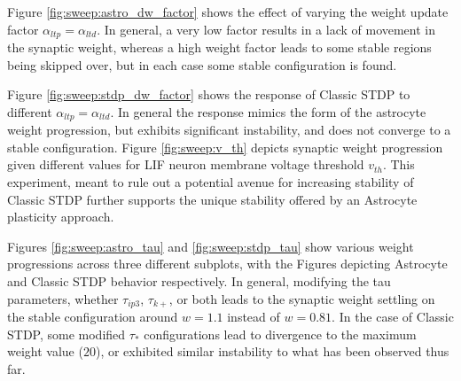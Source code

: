 Figure \ref{fig:sweep:astro_dw_factor} shows the effect of varying the weight
update factor $\alpha_{ltp}=\alpha_{ltd}$. In general, a very low factor results
in a lack of movement in the synaptic weight, whereas a high weight factor leads
to some stable regions being skipped over, but in each case some stable
configuration is found.



Figure \ref{fig:sweep:stdp_dw_factor} shows the response of Classic STDP to
different $\alpha_{ltp}=\alpha_{ltd}$. In general the response mimics the form
of the astrocyte weight progression, but exhibits significant instability, and
does not converge to a stable configuration. Figure \ref{fig:sweep:v_th} depicts
synaptic weight progression given different values for LIF neuron membrane
voltage threshold $v_{th}$. This experiment, meant to rule out a potential
avenue for increasing stability of Classic STDP further supports the unique
stability offered by an Astrocyte plasticity approach.


Figures \ref{fig:sweep:astro_tau} and \ref{fig:sweep:stdp_tau} show various
weight progressions across three different subplots, with the Figures
depicting Astrocyte and Classic STDP behavior respectively. In general,
modifying the tau parameters, whether $\tau_{ip3}$, $\tau_{k+}$, or both leads
to the synaptic weight settling on the stable configuration around $w=1.1$
instead of $w=0.81$. In the case of Classic STDP, some modified $\tau_*$
configurations lead to divergence to the maximum weight value ($20$), or
exhibited similar instability to what has been observed thus far.



